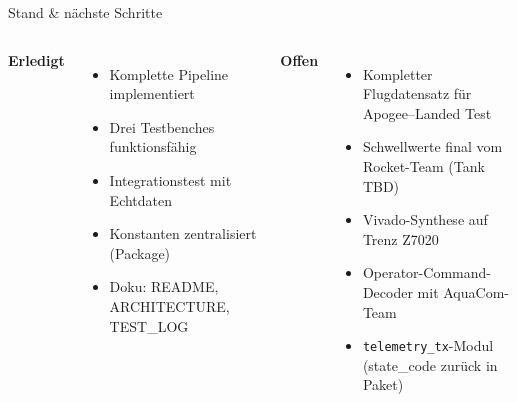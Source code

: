 \documentclass[aspectratio=169,11pt]{beamer}
\begin{document}
\begin{frame}{Stand \& n\"achste Schritte}

    \begin{columns}[T,onlytextwidth]
        \textbf{Erledigt}
        \begin{itemize}\setlength{\itemsep}{2pt}
            \item Komplette Pipeline implementiert
            \item Drei Testbenches funktionsf\"ahig
            \item Integrationstest mit Echtdaten
            \item Konstanten zentralisiert (Package)
            \item Doku: README, ARCHITECTURE, TEST\_LOG
        \end{itemize}

        \textbf{Offen}
        \begin{itemize}\setlength{\itemsep}{2pt}
            \item Kompletter Flugdatensatz f\"ur Apogee--Landed Test
            \item Schwellwerte final vom Rocket-Team (Tank TBD)
            \item Vivado-Synthese auf Trenz Z7020
            \item Operator-Command-Decoder mit AquaCom-Team
            \item \texttt{telemetry\_tx}-Modul (state\_code zur\"uck in Paket)
        \end{itemize}
    \end{columns}

    \vspace{0.9em}
    \begin{center}
    \end{center}

\end{frame}
\end{document}
